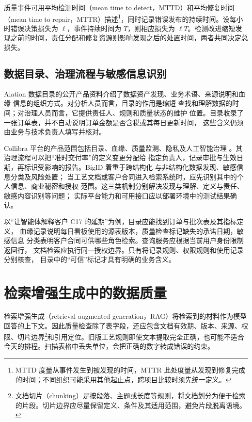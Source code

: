 质量事件可用平均检测时间（mean time to detect，MTTD）和平均修复时间（mean time to repair，MTTR）描述\footnote{MTTD 度量从事件发生到被发现的时间，MTTR 此处度量从发现到修复完成的时间；不同组织可能采用其他起止点，跨项目比较时须先统一定义。}，同时记录错误发布的持续时间。设每小时错误决策损失为 \(\ell\)，事件持续时间为 \(T\)，则相应损失为 \(\ell T\)。检测改进缩短发现之前的时间，责任分配和修复资源则影响发现之后的处置时间，两者共同决定总损失。

\subsection{数据目录、治理流程与敏感信息识别}
Alation 数据目录的公开产品资料介绍了数据资产发现、业务术语、来源说明和血缘
信息的组织方式\cite{alationCatalog2026}。对分析人员而言，目录的作用是缩短
查找和理解数据的时间；对治理人员而言，它提供责任人、规则和质量状态的维护
位置。目录收录了一张订单表，并不自动说明订单金额是否含税或其每日更新时间，
这些含义仍须由业务与技术负责人填写并核对。

Collibra 平台的产品范围包括目录、血缘、质量监测、隐私及人工智能治理
\cite{collibraPlatform2026}。其治理流程可以把“准时交付率”的定义变更分配给
指定负责人，记录审批与生效日期，再标识受影响的报告。BigID 着重于跨结构化
与非结构化数据发现、敏感信息分类及风险处置\cite{bigidDiscovery2026}；
当工艺文档或客户合同进入检索系统时，应先识别其中的个人信息、商业秘密和授权
范围。这三类机制分别解决发现与理解、定义与责任、敏感内容识别等问题；
实际平台能力和可用接口应以部署环境中的测试结果确认。

以“让智能体解释客户 C17 的延期”为例，目录应能找到订单与批次表及其指标定义，
血缘记录说明每日看板使用的源表版本，质量检查标记缺失的承诺日期，敏感信息
分类表明客户合同可供哪些角色检索。查询服务应根据当前用户身份限制返回行，
文档检索应执行同一授权边界。只有将记录规则、权限规则和使用记录分别核查，
目录中的“可信”标记才具有明确的业务含义。

\section{检索增强生成中的数据质量}
检索增强生成（retrieval-augmented generation，RAG）将检索到的材料作为模型回答的上下文。因此质量检查除了表字段，还应包含文档有效期、版本、来源、权限、切片边界\footnote{文档切片（chunking）是按段落、主题或长度等规则，将文档划分为便于检索的片段。切片边界应尽量保留定义、条件及其适用范围，避免片段脱离语境。}和引用定位。旧版工艺规则即使文本提取完全正确，也可能不适合今天的排程。扫描表格中丢失单位，会把正确的数字转成错误的约束。

